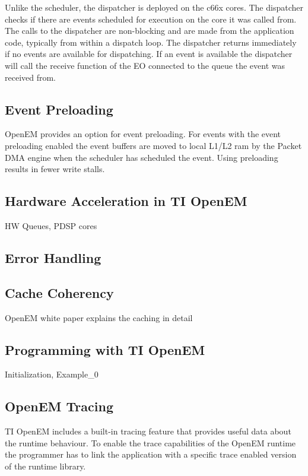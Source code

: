 Unlike the scheduler, the dispatcher is deployed on the c66x cores. The
dispatcher checks if there are events scheduled for execution on the core it was
called from. The calls to the dispatcher are non-blocking and are made from the
application code, typically from within a dispatch loop. The dispatcher returns
immediately if no events are available for dispatching. If an event is available
the dispatcher will call the receive function of the EO connected to the queue
the event was received from. \cite{openemwhite}

\subsection{Event Preloading}
OpenEM provides an option for event preloading. For events with the event
preloading enabled the event buffers are moved to local L1/L2 ram by the Packet
DMA engine when the scheduler has scheduled the event. Using preloading results
in fewer write stalls. \cite{openemwhite}

\subsection{Hardware Acceleration in TI OpenEM}
HW Queues, PDSP cores

\subsection{Error Handling}

\subsection{Cache Coherency}
OpenEM white paper explains the caching in detail

\subsection{Programming with TI OpenEM}
Initialization, Example\_0

\subsection{OpenEM Tracing}
TI OpenEM includes a built-in tracing feature that provides useful data about
the runtime behaviour. To enable the trace capabilities of the OpenEM runtime the
programmer has to link the application with a specific trace enabled version of
the runtime library. \cite{openemapi}

